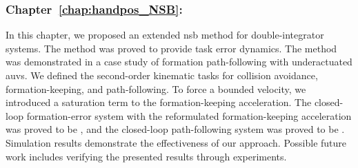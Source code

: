 \subsubsection{Chapter~\ref{chap:handpos_NSB}: }

In this chapter, we proposed an extended \gls{nsb} method for double-integrator systems. The method was proved to provide  task error dynamics. The method was demonstrated in a case study of formation path-following with underactuated \glspl{auv}. We defined the second-order kinematic tasks for collision avoidance, formation-keeping, and path-following. To force a bounded velocity, we introduced a saturation term to the formation-keeping acceleration. The closed-loop formation-error system with the reformulated formation-keeping acceleration was proved to be , and the closed-loop path-following system was proved to be . Simulation results demonstrate the effectiveness of our approach. Possible future work includes verifying the presented results through experiments.
